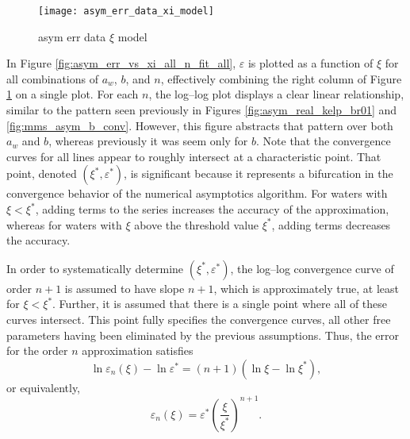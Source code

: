\begin{figure}[H]
  \centering
  \texttt{[image: asym\_err\_data\_xi\_model]}
  \caption{asym err data $\xi$ model}
  \label{fig:asym_err_data_xi_model}
\end{figure}

In Figure \ref{fig:asym_err_vs_xi_all_n_fit_all}, $\varepsilon$ is plotted as a function of $\xi$ for all combinations of $a_w$, $b$, and $n$, effectively combining the right column of Figure \ref{fig:asym_err_data_xi_model} on a single plot.
For each $n$, the log--log plot displays a clear linear relationship, similar to the pattern seen previously in Figures \ref{fig:asym_real_kelp_br01} and \ref{fig:mms_asym_b_conv}.
However, this figure abstracts that pattern over both $a_w$ and $b$, whereas previously it was seem only for $b$.
Note that the convergence curves for all lines appear to roughly intersect at a characteristic point.
That point, denoted $(\xi^*, \varepsilon^*)$, is significant because it represents a bifurcation in the convergence behavior of the numerical asymptotics algorithm.
For waters with $\xi < \xi^*$, adding terms to the series increases the accuracy of the approximation, whereas for waters with $\xi$ above the threshold value $\xi^*$, adding terms decreases the accuracy.

In order to systematically determine $(\xi^*, \varepsilon^*)$, the log--log convergence curve of order $n+1$ is assumed to have slope $n+1$, which is approximately true, at least for $\xi<\xi^*$.
Further, it is assumed that there is a single point where all of these curves intersect.
This point fully specifies the convergence curves, all other free parameters having been eliminated by the previous assumptions.
Thus, the error for the order $n$ approximation satisfies
\begin{equation}
  \label{eqn:ln_eps_n}
  \ln\varepsilon_n(\xi) - \ln\varepsilon^* = (n+1)\left(\ln\xi - \ln\xi^*\right),
\end{equation}
or equivalently,
\begin{equation}
  \label{eqn:eps_n}
  \varepsilon_n(\xi) = \varepsilon^* \left(\frac{\xi}{\xi^*}\right)^{n+1}.
\end{equation}

